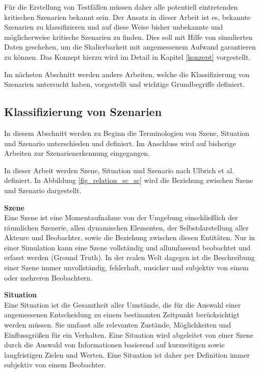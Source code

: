 Für die Erstellung von Testfällen müssen daher alle potentiell eintretenden kritischen Szenarien bekannt sein. Der Ansatz in dieser Arbeit ist es, bekannte Szenarien zu klassifizieren und auf diese Weise bisher unbekannte und möglicherweise kritische Szenarien zu finden. Dies soll mit Hilfe von simulierten Daten geschehen, um die Skalierbarkeit mit angemessenem Aufwand garantieren zu können. Das Konzept hierzu wird im Detail in Kapitel \ref{konzept} vorgestellt.

 Im nächsten Abschnitt werden andere Arbeiten, welche die Klassifizierung von Szenarien untersucht haben, vorgestellt und wichtige Grundbegriffe definiert.


\subsection{Klassifizierung von Szenarien}
\label{grundlagen_fahren_szenarien}

In diesem Abschnitt werden zu Beginn die Terminologien von Szene, Situation und Szenario unterschieden und definiert. Im Anschluss wird auf bisherige Arbeiten zur Szenarienerkennung eingegangen.

In dieser Arbeit werden Szene, Situation und Szenario nach Ulbrich et al. \cite{ulbrich2015defining} definiert. In Abbildung \ref{fig_relation_sc_sc} wird die Beziehung zwischen Szene und Szenario dargestellt.

\vspace{0,3cm}
\noindent\textbf{Szene}\\
Eine Szene ist eine Momentaufnahme von der Umgebung einschließlich der räumlichen Szenerie,  allen dynamischen Elementen, der Selbstdarstellung aller Akteure und Beobachter, sowie die Beziehung zwischen diesen Entitäten. Nur in einer Simulation kann eine Szene vollständig und allumfassend beobachtet und erfasst werden (Ground Truth). In der realen Welt dagegen ist die Beschreibung einer Szene immer unvollständig, fehlerhaft, unsicher und subjektiv von einem oder mehreren Beobachtern.

\vspace{0,3cm}
\noindent\textbf{Situation}\\
Eine Situation ist die Gesamtheit aller Umstände, die für die Auswahl einer angemessenen Entscheidung zu einem bestimmten Zeitpunkt berücksichtigt werden müssen. Sie umfasst alle relevanten Zustände, Möglichkeiten und Einflussgrößen für ein Verhalten. Eine Situation wird abgeleitet von einer Szene durch die Auswahl von Informationen basierend auf kurzzeitigen sowie langfristigen Zielen und Werten. Eine Situation ist daher per Definition immer subjektiv von einem Beobachter.


